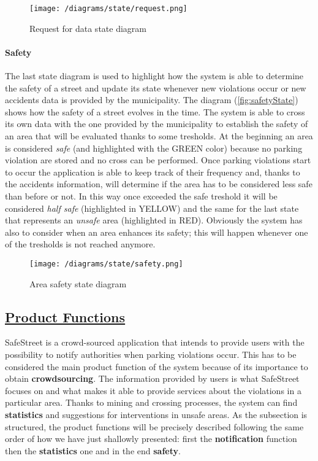 		\vspace{0.3cm}
		\begin{figure}[h]
			\centering
			\texttt{[image: /diagrams/state/request.png]}
			\caption{\label{fig:requestState}Request for data state diagram}
		\end{figure}
	
	\paragraph{Safety}
		The last state diagram is used to highlight how the system is able to determine the safety of a street and update its state whenever new violations occur or new accidents data is provided by the municipality. 
		The diagram (\autoref{fig:safetyState}) shows how the safety of a street evolves in the time. The system is able to cross its own data with the one provided by the municipality to establish the safety of an area that will be evaluated thanks to some tresholds. At the beginning an area is considered \textit{safe} (and highlighted with the GREEN color) because no parking violation are stored and no cross can be performed. Once parking violations start to occur the application is able to keep track of their frequency and, thanks to the accidents information, will determine if the area has to be considered less safe than before or not. In this way once exceeded the safe treshold it will be considered \textit{half safe} (highlighted in YELLOW) and the same for the last state that represents an \textit{unsafe} area (highlighted in RED). Obviously the system has also to consider when an area enhances its safety; this will happen whenever one of the tresholds is not reached anymore. 
		
		\vspace{0.3cm}
		\begin{figure}[h]
			\centering
			\texttt{[image: /diagrams/state/safety.png]}
			\caption{\label{fig:safetyState}Area safety state diagram}
		\end{figure}   

\subsection[Product Functions]{\hyperlink{toc}{Product Functions}}
	\label{sec:productFunctions}
	SafeStreet is a crowd-sourced application that intends to provide users with the possibility to notify authorities when parking violations occur. This has to be considered the main product function of the system because of its importance to obtain \textbf{crowdsourcing}. The information provided by users is what SafeStreet focuses on and what makes it able to provide services about the violations in a particular area. Thanks to mining and crossing processes, the system can find \textbf{statistics} and suggestions for interventions in unsafe areas. As the subsection is structured, the product functions will be precisely described following the same order of how we have just shallowly presented: first the \textbf{notification} function then the \textbf{statistics} one and in the end \textbf{safety}.
	
